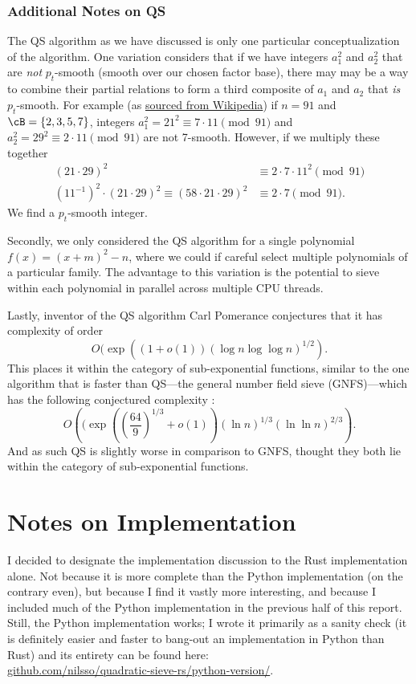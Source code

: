 \documentclass{report}
\begin{document}
\subsection{Additional Notes on QS}

The QS algorithm as we have discussed is only one particular conceptualization of the algorithm.
One variation considers that if we have integers $a_1^2$ and $a_2^2$ that are \emph{not} $p_t$-smooth
(smooth over our chosen factor base), there may may be a way to combine their partial relations
to form a third composite of $a_1$ and $a_2$ that \emph{is} $p_t$-smooth. For example (as
\href{https://en.wikipedia.org/wiki/Quadratic_sieve#Partial_relations_and_cycles}{sourced from Wikipedia})
if $n=91$ and $\cB=\{2,3,5,7\}$, integers $a_1^2={21}^2\equiv 7\cdot 11\pmod{91}$ and
$a_2^2={29}^2\equiv 2\cdot 11\pmod{91}$ are not 7-smooth. However, if we multiply these together
\begin{align*}
    (21\cdot 29)^2
    &\equiv 2\cdot 7\cdot 11^2 \pmod{91} \\
    ({11}^{-1})^2\cdot (21\cdot 29)^2
    \equiv (58\cdot 21\cdot 29)^2
    &\equiv 2\cdot 7 \pmod{91}.
\end{align*}
We find a $p_t$-smooth integer.

Secondly, we only considered the QS algorithm for a single polynomial $f(x)=(x+m)^2-n$,
where we could if careful select multiple polynomials of a particular family.
The advantage to this variation is the potential to sieve within each polynomial in parallel
across multiple CPU threads.

Lastly, inventor of the QS algorithm Carl Pomerance conjectures \cite{pomerance}
that it has complexity of order
\[
    O(\exp((1+o(1))(\log n\log\log n)^{1/2}).
\]
This places it within the category of sub-exponential functions,
similar to the one algorithm that is faster than QS---the general number field sieve (GNFS)---which
has the following conjectured complexity \cite{wiki-gnfs}:
\[
    O\left((\exp\left({\left(\frac{64}{9}\right)}^{1/3}+o(1)\right)(\ln n)^{1/3}(\ln\ln n)^{2/3}\right).
\]
And as such QS is slightly worse in comparison to GNFS, thought they both lie
within the category of sub-exponential functions.

\chapter{Notes on Implementation}

I decided to designate the implementation discussion to the Rust implementation alone.
Not because it is more complete than
the Python implementation (on the contrary even), but because I find it vastly
more interesting, and because I included much of the Python implementation in the previous half
of this report. Still, the Python implementation works; I wrote it primarily as a sanity
check (it is definitely easier and faster to bang-out an implementation in
Python than Rust) and its entirety can be found here:\\
\href{https://github.com/nilsso/quadratic-sieve-rs/tree/main/python-version}{github.com/nilsso/quadratic-sieve-rs/python-version/}.
\end{document}
